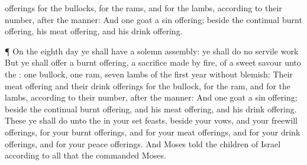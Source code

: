 {offerings for the
bullocks, for the
rams, and for the
lambs,
{} according to their
number, after the
manner:
And
one
goat
{} a sin
offering; beside the
continual burnt
offering, his meat
offering, and his drink
offering.
\par }{\PP {}¶ On the
eighth
day ye shall have a solemn
assembly: ye shall
do no
servile
work
{}
But ye shall
offer a burnt
offering, a sacrifice made by
fire, of a
sweet
savour unto the
{}:
one
bullock,
one
ram,
seven
lambs of the
first
year without
blemish:
Their meat
offering and their drink
offerings for the
bullock, for the
ram, and for the
lambs,
{} according to their
number, after the
manner:
And
one
goat
{} a sin
offering; beside the
continual burnt
offering, and his meat
offering, and his drink
offering.
These
{} ye shall
do unto the
{} in your set
feasts, beside your
vows, and your freewill
offerings, for your burnt
offerings, and for your meat
offerings, and for your drink
offerings, and for your peace
offerings.
And
Moses
told the
children of
Israel according to all that the
{}
commanded
Moses.

}
